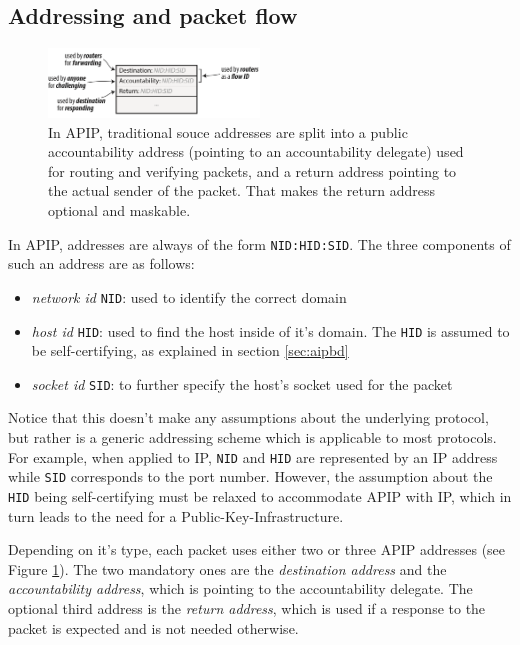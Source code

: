 \documentclass{acm_proc_article-sp}
\begin{document}
\subsection{Addressing and packet flow}
\begin{figure}[h]
  \includegraphics[width=0.5\textwidth]{images/apipaddressing.PNG}
  \caption{In APIP, traditional souce addresses are split into a public accountability address (pointing to an accountability delegate) used for routing and verifying packets, and a return address pointing to the actual sender of the packet. That makes the return address optional and maskable. \cite{apip}}
  \label{fig:apipaddressing}
\end{figure}

In APIP, addresses are always of the form \texttt{NID:HID:SID}. The three components of such an address are as follows:

\begin{itemize}
\item \emph{network id} \texttt{NID}: used to identify the correct domain
\item \emph{host id} \texttt{HID}: used to find the host inside of it's domain. The \texttt{HID} is assumed to be self-certifying, as explained in section \ref{sec:aipbd}
\item \emph{socket id} \texttt{SID}: to further specify the host's socket used for the packet
\end{itemize}

Notice that this doesn't make any assumptions about the underlying protocol, but rather is a generic addressing scheme which is applicable to most protocols. For example, when applied to IP, \texttt{NID} and \texttt{HID} are represented by an IP address while \texttt{SID} corresponds to the port number. However, the assumption about the \texttt{HID} being self-certifying must be relaxed to accommodate APIP with IP, which in turn leads to the need for a Public-Key-Infrastructure. 

Depending on it's type, each packet uses either two or three APIP addresses (see Figure \ref{fig:apipaddressing}). The two mandatory ones are the \emph{destination address} and the \emph{accountability address}, which is pointing to the accountability delegate. The optional third address is the \emph{return address}, which is used if a response to the packet is expected and is not needed otherwise.
\end{document}
